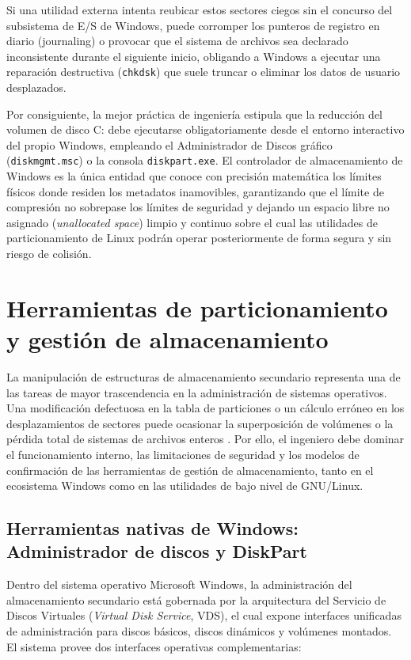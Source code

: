 \documentclass[12pt]{article}
\begin{document}
Si una utilidad externa intenta reubicar estos sectores ciegos sin el concurso del subsistema de E/S de Windows, puede corromper los punteros de registro en diario (journaling) o provocar que el sistema de archivos sea declarado inconsistente durante el siguiente inicio, obligando a Windows a ejecutar una reparación destructiva (\texttt{chkdsk}) que suele truncar o eliminar los datos de usuario desplazados.

Por consiguiente, la mejor práctica de ingeniería estipula que la reducción del volumen de disco C: debe ejecutarse obligatoriamente desde el entorno interactivo del propio Windows, empleando el Administrador de Discos gráfico (\texttt{diskmgmt.msc}) o la consola \texttt{diskpart.exe}. El controlador de almacenamiento de Windows es la única entidad que conoce con precisión matemática los límites físicos donde residen los metadatos inamovibles, garantizando que el límite de compresión no sobrepase los límites de seguridad y dejando un espacio libre no asignado (\textit{unallocated space}) limpio y continuo sobre el cual las utilidades de particionamiento de Linux podrán operar posteriormente de forma segura y sin riesgo de colisión.

\section{Herramientas de particionamiento y gestión de almacenamiento}
\label{sec:herramientasParticionamiento}

La manipulación de estructuras de almacenamiento secundario representa una de las tareas de mayor trascendencia en la administración de sistemas operativos. Una modificación defectuosa en la tabla de particiones o un cálculo erróneo en los desplazamientos de sectores puede ocasionar la superposición de volúmenes o la pérdida total de sistemas de archivos enteros \parencite[\S 12.5.2, pp.\ 419--420]{silberschatz2006fundamentos}. Por ello, el ingeniero debe dominar el funcionamiento interno, las limitaciones de seguridad y los modelos de confirmación de las herramientas de gestión de almacenamiento, tanto en el ecosistema Windows como en las utilidades de bajo nivel de GNU/Linux.

\subsection{Herramientas nativas de Windows: Administrador de discos y DiskPart}
\label{sec:herramientasWindows}

Dentro del sistema operativo Microsoft Windows, la administración del almacenamiento secundario está gobernada por la arquitectura del Servicio de Discos Virtuales (\textit{Virtual Disk Service}, VDS), el cual expone interfaces unificadas de administración para discos básicos, discos dinámicos y volúmenes montados. El sistema provee dos interfaces operativas complementarias:
\end{document}
